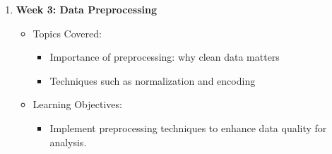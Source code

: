 \documentclass[aspectratio=169]{beamer}
\begin{document}
\begin{frame}[fragile]
\begin{enumerate}
    \item \textbf{Week 3: Data Preprocessing}
      \begin{itemize}
        \item Topics Covered:
        \begin{itemize}
          \item Importance of preprocessing: why clean data matters
          \item Techniques such as normalization and encoding
        \end{itemize}
        \item Learning Objectives:
        \begin{itemize}
          \item Implement preprocessing techniques to enhance data quality for analysis.
        \end{itemize}
      \end{itemize}
  \end{enumerate}
\end{frame}
\end{document}
